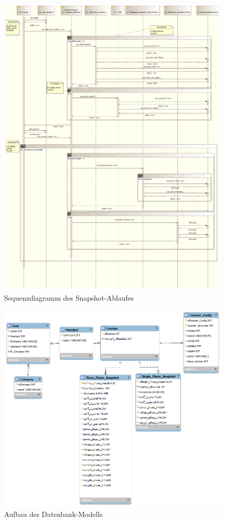\documentclass[Bachelorarbeit.tex]{subfiles}
\begin{document}
\begin{figure}
\centering
\includegraphics[width=1.2\linewidth]{./img/Sequenzdiagramm_TakeSnapshot}
\caption{Sequenzdiagramm des Snapshot-Ablaufes}
\label{pic:sequenzdiagramm_takeSnapshot}
\end{figure}
\newpage

\begin{figure}
\centering
\includegraphics[width=0.9\linewidth]{./img/db_modell}
\caption{Aufbau des Datenbank-Modells}
\label{pic:db_modell}
\end{figure}
\newpage
\end{document}
